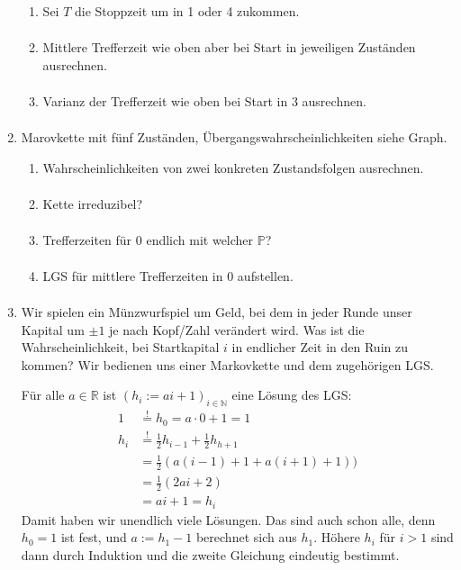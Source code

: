 \documentclass[a4paper,11pt,notitlepage,fullpage]{article}
\newcommand{\R}{\mathbb R}
\newcommand{\N}{\mathbb N}
\newcommand{\p}{\mathbb P}
\begin{document}
\begin{enumerate}
\begin{enumerate}
\item Sei $T$ die Stoppzeit um in 1 oder 4 zukommen.
\begin{align*}
\end{align*}

\item Mittlere Trefferzeit wie oben aber bei Start in jeweiligen Zuständen ausrechnen.
\begin{align*}
\end{align*}

\item Varianz der Trefferzeit wie oben bei Start in $3$ ausrechnen.
\begin{align*}
\end{align*}
\end{enumerate}

\item Marovkette mit fünf Zuständen, Übergangswahrscheinlichkeiten siehe Graph.
\begin{enumerate}
\item Wahrscheinlichkeiten von zwei konkreten Zustandsfolgen ausrechnen.
\begin{align*}
\end{align*}

\item Kette irreduzibel?
\begin{align*}
\end{align*}

\item Trefferzeiten für $0$ endlich mit welcher $\p$?
\begin{align*}
\end{align*}

\item LGS für mittlere Trefferzeiten in $0$ aufstellen.
\begin{align*}
\end{align*}
\end{enumerate}

\item Wir spielen ein Münzwurfspiel um Geld, bei dem in jeder Runde unser Kapital um $\pm 1$ je nach Kopf/Zahl verändert wird. Was ist die Wahrscheinlichkeit, bei Startkapital $i$ in endlicher Zeit in den Ruin zu kommen? Wir bedienen uns einer Markovkette und dem zugehörigen LGS.

Für alle $a \in \R$ ist $(h_i := ai + 1)_{i \in \N}$ eine Lösung des LGS:
\begin{align*}
1 &\stackrel{!}{=} h_0 = a\cdot 0 + 1 = 1 \\
h_i &\stackrel{!}{=} \frac{1}{2}h_{i-1} + \frac{1}{2}h_{h+1} \\
&= \frac{1}{2}(a(i-1) + 1 + a(i+1) + 1)) \\
&= \frac{1}{2}(2ai + 2) \\
&= ai+1 = h_i
\end{align*}
Damit haben wir unendlich viele Lösungen. Das sind auch schon alle, denn $h_0 = 1$ ist fest, und $a := h_1 - 1$ berechnet sich aus $h_1$. Höhere $h_i$ für $i>1$ sind dann durch Induktion und die zweite Gleichung eindeutig bestimmt.


\end{enumerate}
\end{document}
